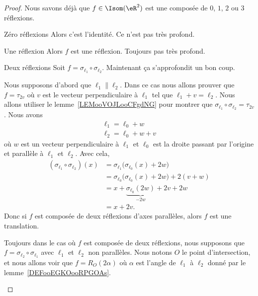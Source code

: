 \begin{proof}
    Nous savons déjà que \( f\in \Isom(\eR^2)\) est une composée de \( 0\), \( 1\), \( 2\) ou \( 3\) réflexions.
    \begin{subproof}
        \item[Zéro réflexions]
            Alors c'est l'identité. Ce n'est pas très profond.
        \item[Une réflexion]
            Alors \( f\) est une réflexion. Toujours pas très profond.
        \item[Deux réflexions]
            Soit \( f=\sigma_{\ell_1}\circ\sigma_{\ell_2}\). Maintenant ça s'approfondit un bon coup.

            Nous supposons d'abord que \( \ell_1\parallel\ell_2\). Dans ce cas nous allons prouver que \( f=\tau_{2v}\) où \( v\) est le vecteur perpendiculaire à \(  \ell_1 \) tel que \( \ell_1+v=\ell_2\). Nous allons utiliser le lemme~\ref{LEMooVOJLooCFgdNG} pour montrer que \( \sigma_{\ell_1}\circ\sigma_{\ell_2}=\tau_{2v}\). Nous avons
            \begin{subequations}
                \begin{align}
                    \ell_1=\ell_0+w\\
                    \ell_2=\ell_0+w+v
                \end{align}
            \end{subequations}
            où \( w\) est un vecteur perpendiculaire à \( \ell_1\) et \( \ell_0\) est la droite passant par l'origine et parallèle à \( \ell_1\) et \( \ell_2\). Avec cela,
            \begin{subequations}
                \begin{align}
                    (\sigma_{\ell_1}\circ\sigma_{\ell_2})(x)&=\sigma_{\ell_1}\big( \sigma_{\ell_0}(x)+2w \big)\\
                    &=\sigma_{\ell_0}\big( \sigma_{\ell_0}(x)+2w \big)+2(v+w)\\
                    &=x+\underbrace{\sigma_{\ell_0}(2w)}_{-2w}+2v+2w\\
                    &=x+2v.
                \end{align}
            \end{subequations}
            Donc si \( f\) est composée de deux réflexions d'axes parallèles, alors \( f\) est une translation.

            Toujours dans le cas où \( f\) est composée de deux réflexions, nous supposons que \( f=\sigma_{\ell_2}\circ\sigma_{\ell_1}\) avec \( \ell_1\) et \( \ell_2\) non parallèles. Nous notons \( O\) le point d'intersection, et nous allons voir que \( f=R_O(2\alpha)\) où \( \alpha\) est l'angle de \( \ell_1\) à \( \ell_2\) donné par le lemme~\ref{DEFooEGKOooRPGOAs}.


\end{subproof}
\end{proof}
